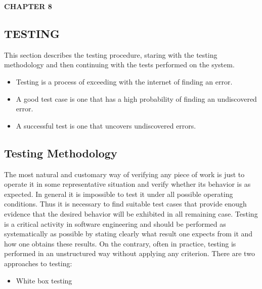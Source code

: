 \documentclass[12pt]{article}
\begin{document}
\begin{enumerate}
\newpage
\begin{flushleft}\textbf{CHAPTER 8} \end{flushleft}
\begin{flushleft}\section{TESTING} \end{flushleft}
\vspace*{10px}
This section describes the testing procedure, staring with the testing methodology
and then continuing with the tests performed on the system.
\begin{itemize}
\item Testing is a process of exceeding with the internet of finding an error.
\item A good test case is one that has a high probability of finding an undiscovered error.
\item A successful test is one that uncovers undiscovered errors.
\end{itemize}

\subsection{Testing Methodology}
The most natural and customary way of verifying any piece of work is just to operate
it in some representative situation and verify whether its behavior is as expected. In
general it is impossible to test it under all possible operating conditions. Thus it
is necessary to find suitable test cases that provide enough evidence that the desired
behavior will be exhibited in all remaining case. Testing is a critical activity in software
engineering and should be performed as systematically as possible by stating clearly
what result one expects from it and how one obtains these results. On the contrary,
often in practice, testing is performed in an unstructured way without applying any
criterion. There are two approaches to testing:
\begin{itemize}
\item White box testing


\end{itemize}
\end{enumerate}
\end{document}
